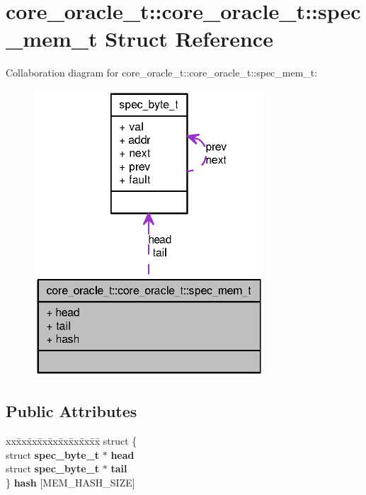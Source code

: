 \section{core\_\-oracle\_\-t::core\_\-oracle\_\-t::spec\_\-mem\_\-t Struct Reference}
\label{structcore__oracle__t_1_1spec__mem__t}
Collaboration diagram for core\_\-oracle\_\-t::core\_\-oracle\_\-t::spec\_\-mem\_\-t:\nopagebreak
\begin{figure}[H]
\begin{center}
\leavevmode
\includegraphics[width=244pt]{structcore__oracle__t_1_1spec__mem__t__coll__graph}
\end{center}
\end{figure}
\subsection*{Public Attributes}
\begin{CompactItemize}
\item 
\begin{tabbing}
xx\=xx\=xx\=xx\=xx\=xx\=xx\=xx\=xx\=\kill
struct \{\\
\>struct {\bf spec\_byte\_t} $\ast$ {\bf head}\\
\>struct {\bf spec\_byte\_t} $\ast$ {\bf tail}\\
\} {\bf hash} [MEM\_HASH\_SIZE]\\

\end{tabbing}\end{CompactItemize}


